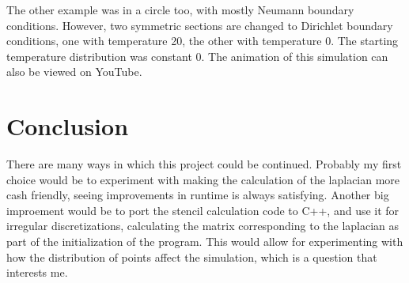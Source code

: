 \documentclass[pdftex,12pt,a4paper]{article}
\begin{document}
		The other example was in a circle too, with mostly Neumann boundary conditions. However, two symmetric sections are changed to Dirichlet boundary conditions, one with temperature 20, the other with temperature 0. The starting temperature distribution was constant 0. The animation of this simulation can also be viewed on YouTube. \cite{conduction}
	\section{Conclusion}
		There are many ways in which this project could be continued. Probably my first choice would be to experiment with making the calculation of the laplacian more cash friendly, seeing improvements in runtime is always satisfying. Another big improement would be to port the stencil calculation code to C++, and use it for irregular discretizations, calculating the matrix corresponding to the laplacian as part of the initialization of the program. This would allow for experimenting with how the distribution of points affect the simulation, which is a question that interests me.
	
    
\end{document}
